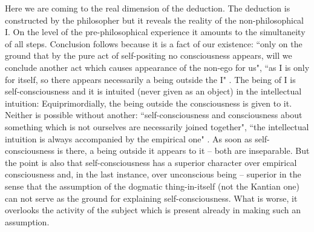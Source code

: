 Here we are coming to the real dimension of the deduction. The deduction is constructed by the philosopher but 
it reveals the reality of the non-philosophical I. On the level of the pre-philosophical experience it amounts to the 
simultaneity of all steps. Conclusion follows because it is a fact of our existence: ``only on the ground that by the 
pure act of self-positing no consciousness appears, will we conclude another act which causes appearance of the non-ego for us", ``as I is only for itself, so there appears necessarily a being outside the I" \cite{ITS}. The being of I is self-consciousness and it is intuited 
(never given as an object) in the intellectual intuition: Equiprimordially, the 
being outside the consciousness is given to it. Neither is possible without another: ``self-consciousness and 
consciousness about something which is not ourselves are necessarily joined together", ``the intellectual intuition 
is always accompanied by the empirical one" \cite{ITS}. As soon as self-consciousness is there, a being outside it appears to 
it -- both are inseparable. But the point is also that self-consciousness has a superior character over empirical 
consciousness and, in the last instance, over unconscious being -- superior in the sense that the assumption of the 
dogmatic thing-in-itself (not the Kantian one) can not serve as the ground for explaining self-consciousness. What 
is worse, it overlooks the activity of the subject which is present  already in making such an assumption.

